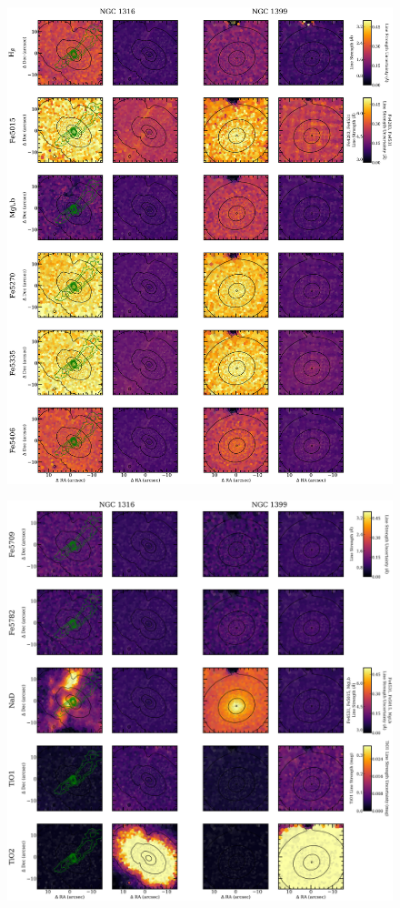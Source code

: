 		\begin{figure}
			\centering
			\includegraphics[height=0.81\textheight]{chapter4/muse/abs2.png}
		\end{figure}
		\begin{figure}
			\centering
			\includegraphics[height=0.67\textheight]{chapter4/muse/abs2b.png}
		\end{figure}

